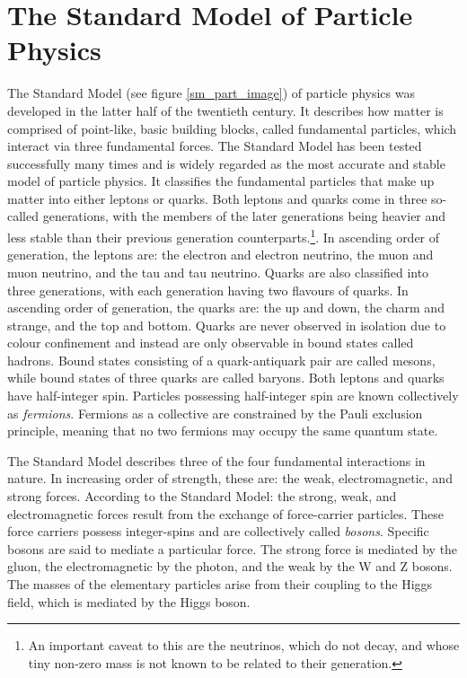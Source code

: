 \documentclass{article}
\begin{document}
\section{The Standard Model of Particle Physics}
The Standard Model (see figure \ref{sm_part_image}) of particle physics was developed in the latter half of the twentieth century. It describes how matter is comprised of point-like, basic building blocks, called fundamental particles, which interact via three fundamental forces. The Standard Model has been tested successfully many times and is widely regarded as the most accurate and stable model of particle physics. It classifies the fundamental particles that make up matter into either leptons or quarks. Both leptons and quarks come in three so-called generations, with the members of the later generations being heavier and less stable than their previous generation counterparts.\footnote{An important caveat to this are the neutrinos, which do not decay, and whose tiny non-zero mass is not known to be related to their generation.}. In ascending order of generation, the leptons are: the electron and electron neutrino, the muon and muon neutrino, and the tau and tau neutrino. Quarks are also classified into three generations, with each generation having two flavours of quarks. In ascending order of generation, the quarks are: the up and down, the charm and strange, and the top and bottom. Quarks are never observed in isolation due to colour confinement and instead are only observable in bound states called hadrons. Bound states consisting of a quark-antiquark pair are called mesons, while bound states of three quarks are called baryons. Both leptons and quarks have half-integer spin. Particles possessing half-integer spin are known collectively as \emph{fermions}. Fermions as a collective are constrained by the Pauli exclusion principle, meaning that no two fermions may occupy the same quantum state.

The Standard Model describes three of the four fundamental interactions in nature. In increasing order of strength, these are: the weak, electromagnetic, and strong forces. According to the Standard Model: the strong, weak, and electromagnetic forces result from the exchange of force-carrier particles. These force carriers possess integer-spins  and are collectively called \emph{bosons}. Specific bosons are said to mediate a particular force. The strong force is mediated by the gluon, the electromagnetic by the photon, and the weak by the W and Z bosons. The masses of the elementary particles arise from their coupling to the Higgs field, which is mediated by the Higgs boson.
\end{document}

